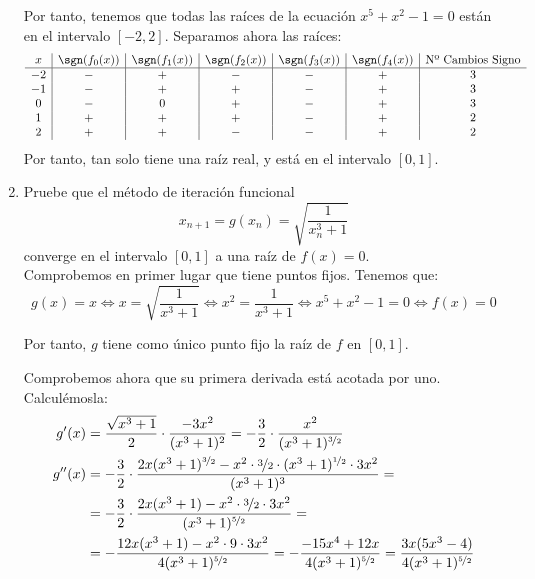 \begin{ejercicio}
\begin{enumerate}
        Por tanto, tenemos que todas las raíces de la ecuación $x^5+x^2-1=0$ están en el intervalo $[-2,2]$. Separamos ahora las raíces:
        \begin{equation*}
            \begin{array}{c|c|c|c|c|c|c}
                x & \sgn(f_0(x)) & \sgn(f_1(x)) & \sgn(f_2(x)) & \sgn(f_3(x)) & \sgn(f_4(x)) & \text{Nº Cambios Signo}\\ \hline
                -2& - & + & - & - & + & 3\\
                -1& - & + & + & - & + & 3\\
                0 & - & 0 & + & - & + & 3\\
                1 & + & + & + & - & + & 2\\
                2 & + & + & - & - & + & 2
            \end{array}
        \end{equation*}
        Por tanto, tan solo tiene una raíz real, y está en el intervalo $[0,1]$.
        \item Pruebe que el método de iteración funcional
        $$x_{n+1} = g(x_n) = \sqrt{\dfrac{1}{x_n^3+1}}$$
        converge en el intervalo $[0, 1]$ a una raíz de $f(x) = 0$.\\

        Comprobemos en primer lugar que tiene puntos fijos. Tenemos que:
        \begin{equation*}
            g(x)=x\iff x=\sqrt{\dfrac{1}{x^3+1}}\iff x^2=\dfrac{1}{x^3+1}\iff x^5+x^2-1=0\iff f(x)=0
        \end{equation*}

        Por tanto, $g$ tiene como único punto fijo la raíz de $f$ en $[0,1]$.
        
        Comprobemos ahora que su primera derivada está acotada por uno. Calculémosla:
        \begin{align*}
            g'(x)&= \dfrac{\sqrt{x^3+1}}{2}\cdot \dfrac{-3x^2}{(x^3+1)^2}
            = -\dfrac{3}{2}\cdot \dfrac{x^2}{(x^3+1)^{\nicefrac{3}{2}}}\\
            g''(x)&=-\dfrac{3}{2}\cdot \dfrac{2x(x^3+1)^{\nicefrac{3}{2}}-x^2\cdot \nicefrac{3}{2}\cdot (x^3+1)^{\nicefrac{1}{2}}\cdot 3x^2}{(x^3+1)^3}
            =\\&=-\dfrac{3}{2}\cdot \dfrac{2x(x^3+1)-x^2\cdot \nicefrac{3}{2}\cdot 3x^2}{(x^3+1)^{\nicefrac{5}{2}}}
            =\\&=-\dfrac{12x(x^3+1)-x^2\cdot9\cdot 3x^2}{4(x^3+1)^{\nicefrac{5}{2}}}
            =-\dfrac{-15x^4+12x}{4(x^3+1)^{\nicefrac{5}{2}}}
            =\dfrac{3x(5x^3-4)}{4(x^3+1)^{\nicefrac{5}{2}}}
        \end{align*}


\end{enumerate}
\end{ejercicio}
